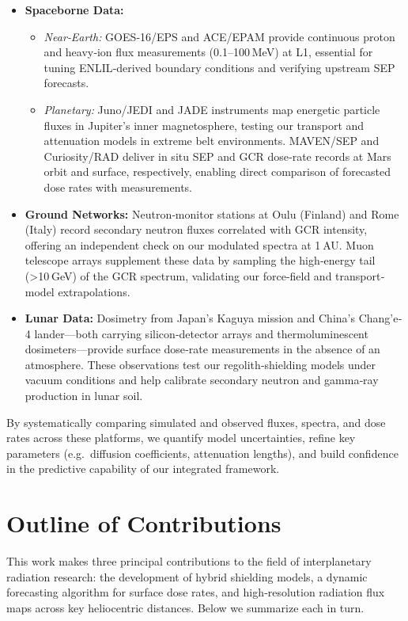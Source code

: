 \documentclass[12pt]{report}
\begin{document}
\begin{itemize}
  \item \textbf{Spaceborne Data:}  
    \begin{itemize}
      \item \emph{Near‐Earth:} GOES‐16/EPS and ACE/EPAM provide continuous proton and heavy‐ion flux measurements (0.1–100 MeV) at L1, essential for tuning ENLIL‐derived boundary conditions and verifying upstream SEP forecasts.
      \item \emph{Planetary:}  
        Juno/JEDI and JADE instruments map energetic particle fluxes in Jupiter’s inner magnetosphere, testing our transport and attenuation models in extreme belt environments.  
        MAVEN/SEP and Curiosity/RAD deliver in situ SEP and GCR dose‐rate records at Mars orbit and surface, respectively, enabling direct comparison of forecasted dose rates with measurements.
    \end{itemize}
  \item \textbf{Ground Networks:}  
    Neutron‐monitor stations at Oulu (Finland) and Rome (Italy) record secondary neutron fluxes correlated with GCR intensity, offering an independent check on our modulated spectra at 1 AU.  Muon telescope arrays supplement these data by sampling the high‐energy tail (>10 GeV) of the GCR spectrum, validating our force‐field and transport‐model extrapolations.
  \item \textbf{Lunar Data:}  
    Dosimetry from Japan’s Kaguya mission and China’s Chang’e‐4 lander—both carrying silicon‐detector arrays and thermoluminescent dosimeters—provide surface dose‐rate measurements in the absence of an atmosphere.  These observations test our regolith‐shielding models under vacuum conditions and help calibrate secondary neutron and gamma‐ray production in lunar soil.
\end{itemize}

By systematically comparing simulated and observed fluxes, spectra, and dose rates across these platforms, we quantify model uncertainties, refine key parameters (e.g.\ diffusion coefficients, attenuation lengths), and build confidence in the predictive capability of our integrated framework.  



\section{Outline of Contributions}

This work makes three principal contributions to the field of interplanetary radiation research: the development of hybrid shielding models, a dynamic forecasting algorithm for surface dose rates, and high‐resolution radiation flux maps across key heliocentric distances.  Below we summarize each in turn.
\end{document}
